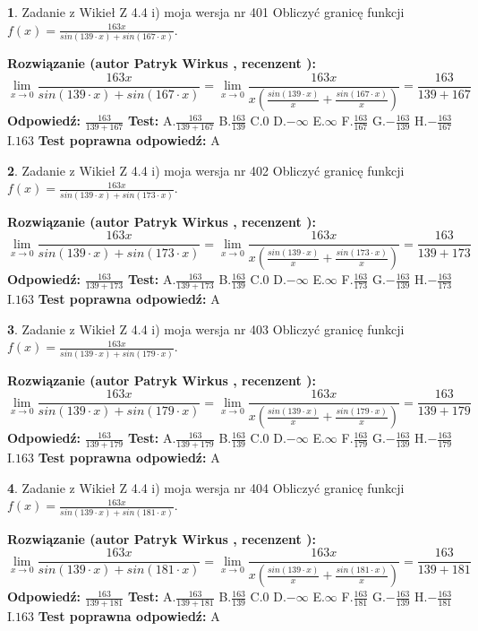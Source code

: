 \documentclass[12pt, a4paper]{article}
\theoremstyle{definition} %
\newtheorem{zad}{}
\newcommand{\zadStart}[1]{\begin{zad}#1\newline}
\newcommand{\zadStop}{\end{zad}}
\newcommand{\rozwStart}[2]{\noindent \textbf{Rozwiązanie (autor #1 , recenzent #2): }\newline}
\newcommand{\rozwStop}{\newline}
\newcommand{\odpStart}{\noindent \textbf{Odpowiedź:}\newline}
\newcommand{\odpStop}{\newline}
\newcommand{\testStart}{\noindent \textbf{Test:}\newline}
\newcommand{\testStop}{\newline}
\newcommand{\kluczStart}{\noindent \textbf{Test poprawna odpowiedź:}\newline}
\newcommand{\kluczStop}{\newline}
\begin{document}
\zadStart{Zadanie z Wikieł Z 4.4 i) moja wersja nr 401}
Obliczyć granicę funkcji $f(x)=\frac{163x}{sin(139\cdot x) +sin(167\cdot x)}$.
\zadStop
\rozwStart{Patryk Wirkus}{}
$$\lim\limits_{x\to 0}\frac{163x}{sin(139\cdot x) +sin(167\cdot x)}=\lim\limits_{x\to 0}\frac{163x}{x(\frac{sin(139\cdot x)}{x}+\frac{sin(167\cdot x)}{x})}=\frac{163}{139+167}$$
\rozwStop
\odpStart
$\frac{163}{139+167}$
\odpStop
\testStart
A.$\frac{163}{139+167}$
B.$\frac{163}{139}$
C.$0$
D.$-\infty$
E.$\infty$
F.$\frac{163}{167}$
G.$-\frac{163}{139}$
H.$-\frac{163}{167}$
I.$163$
\testStop
\kluczStart
A
\kluczStop



\zadStart{Zadanie z Wikieł Z 4.4 i) moja wersja nr 402}
Obliczyć granicę funkcji $f(x)=\frac{163x}{sin(139\cdot x) +sin(173\cdot x)}$.
\zadStop
\rozwStart{Patryk Wirkus}{}
$$\lim\limits_{x\to 0}\frac{163x}{sin(139\cdot x) +sin(173\cdot x)}=\lim\limits_{x\to 0}\frac{163x}{x(\frac{sin(139\cdot x)}{x}+\frac{sin(173\cdot x)}{x})}=\frac{163}{139+173}$$
\rozwStop
\odpStart
$\frac{163}{139+173}$
\odpStop
\testStart
A.$\frac{163}{139+173}$
B.$\frac{163}{139}$
C.$0$
D.$-\infty$
E.$\infty$
F.$\frac{163}{173}$
G.$-\frac{163}{139}$
H.$-\frac{163}{173}$
I.$163$
\testStop
\kluczStart
A
\kluczStop



\zadStart{Zadanie z Wikieł Z 4.4 i) moja wersja nr 403}
Obliczyć granicę funkcji $f(x)=\frac{163x}{sin(139\cdot x) +sin(179\cdot x)}$.
\zadStop
\rozwStart{Patryk Wirkus}{}
$$\lim\limits_{x\to 0}\frac{163x}{sin(139\cdot x) +sin(179\cdot x)}=\lim\limits_{x\to 0}\frac{163x}{x(\frac{sin(139\cdot x)}{x}+\frac{sin(179\cdot x)}{x})}=\frac{163}{139+179}$$
\rozwStop
\odpStart
$\frac{163}{139+179}$
\odpStop
\testStart
A.$\frac{163}{139+179}$
B.$\frac{163}{139}$
C.$0$
D.$-\infty$
E.$\infty$
F.$\frac{163}{179}$
G.$-\frac{163}{139}$
H.$-\frac{163}{179}$
I.$163$
\testStop
\kluczStart
A
\kluczStop



\zadStart{Zadanie z Wikieł Z 4.4 i) moja wersja nr 404}
Obliczyć granicę funkcji $f(x)=\frac{163x}{sin(139\cdot x) +sin(181\cdot x)}$.
\zadStop
\rozwStart{Patryk Wirkus}{}
$$\lim\limits_{x\to 0}\frac{163x}{sin(139\cdot x) +sin(181\cdot x)}=\lim\limits_{x\to 0}\frac{163x}{x(\frac{sin(139\cdot x)}{x}+\frac{sin(181\cdot x)}{x})}=\frac{163}{139+181}$$
\rozwStop
\odpStart
$\frac{163}{139+181}$
\odpStop
\testStart
A.$\frac{163}{139+181}$
B.$\frac{163}{139}$
C.$0$
D.$-\infty$
E.$\infty$
F.$\frac{163}{181}$
G.$-\frac{163}{139}$
H.$-\frac{163}{181}$
I.$163$
\testStop
\kluczStart
A
\kluczStop
\end{document}
